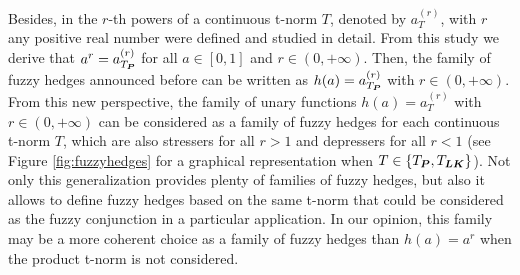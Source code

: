 Besides, in \cite{Walker2002} the $r$-th powers of a continuous t-norm $T$, denoted by $a_T^{(r)}$, with $r$ any positive real number were defined and studied in detail. From this study we derive that $a^r=a_{T_{\bm{P}}}^{(r)}$ for all $a \in [0,1]$ and $r \in(0,+\infty)$. Then, the family of fuzzy hedges announced before can be written as $h(a)=a_{T_{\bm{P}}}^{(r)}$ with $r \in (0,+\infty)$. From this new perspective, the family of unary functions $h(a)=a_T^{(r)}$ with $r \in (0,+\infty)$ can be considered as a family of fuzzy hedges for each continuous t-norm $T$, which are also stressers for all $r>1$ and depressers for all $r<1$ (see Figure \ref{fig:fuzzyhedges} for a graphical representation when $T \in \{T_{\bm{P}},T_{\bm{LK}}\}$). Not only this generalization provides plenty of families of fuzzy hedges, but also it allows to define fuzzy hedges based on the same t-norm that could be considered as the fuzzy conjunction in a particular application. In our opinion, this family may be a more coherent choice as a family of fuzzy hedges than $h(a)=a^r$ when the product t-norm is not considered.

